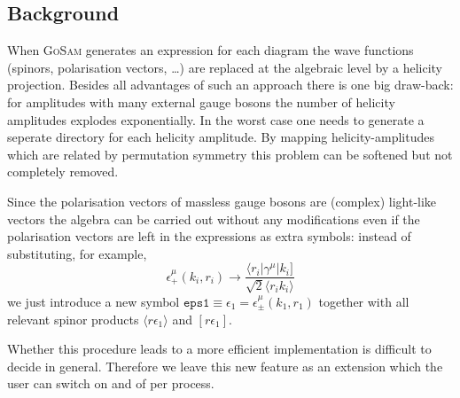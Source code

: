 \documentclass[11pt,a4paper]{refrep}
\newcommand{\golem}{\textsc{GoSam}\xspace}
\begin{document}
\subsection{Background}
When \golem{} generates an expression for each diagram the wave functions
(spinors, polarisation vectors, \dots) are replaced at the algebraic
level by a helicity projection. Besides all advantages of such an approach
there is one big draw-back: for amplitudes with many external gauge bosons
the number of helicity amplitudes explodes exponentially. In the worst case
one needs to generate a seperate directory for each helicity amplitude.
By mapping helicity-amplitudes which are related by permutation symmetry
this problem can be softened but not completely removed.

Since the polarisation vectors of massless gauge bosons are (complex)
light-like vectors the algebra can be carried out without any modifications
even if the polarisation vectors are left in the expressions as extra symbols:
instead of substituting, for example,
\begin{equation}\label{eq:def-epsplus}
\epsilon^\mu_+(k_i, r_i)\to\frac{\langle r_i\vert\gamma^\mu\vert k_i]}%
{\sqrt{2}\langle r_ik_i\rangle}
\end{equation}
we just introduce a new symbol
$\mathtt{eps1}\equiv\epsilon_1=\epsilon^\mu_\pm(k_1, r_1)$
together with all relevant spinor products $\langle r\epsilon_1\rangle$
and $[r\epsilon_1]$.

Whether this procedure leads to a more efficient implementation is difficult
to decide in general. Therefore we leave this new feature as an extension
which the user can switch on and of per process.
\end{document}
